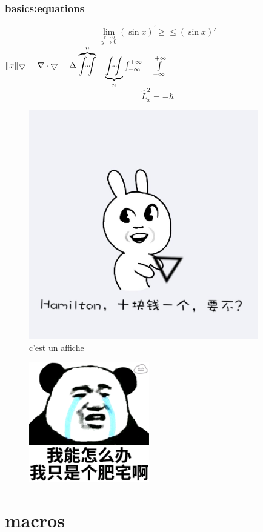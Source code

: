 \documentclass{article}[20pt]
\begin{document}
\section{basics:equations}
$$\lim_{\stackrel{x\to 0}{y \to 0} }(\sin x)^{\prime}\ge\le(\sin x)'$$
$\|x\|\bigtriangledown=\nabla\cdot\bigtriangledown=\Delta
  \stackrel{n}{{\overbrace{\idotsint}}}=\underbrace{\idotsint}\limits_{n}\int_{-\infty}^{+\infty}=\int\limits_{-\infty}^{+\infty}
$
\begin{equation}
\hat{L}_x^2=-\hbar
\end{equation}
\begin{figure}
	\includegraphics[width=10cm,height=10cm]{2}
	\caption[affiche 1]{c'est un affiche}
	\label{fig:2}
\end{figure}
\begin{figure}
	\includegraphics{1}
	\caption{}
	\label{fig:1}
\end{figure}
\part{macros}\cite{key}
\end{document}
